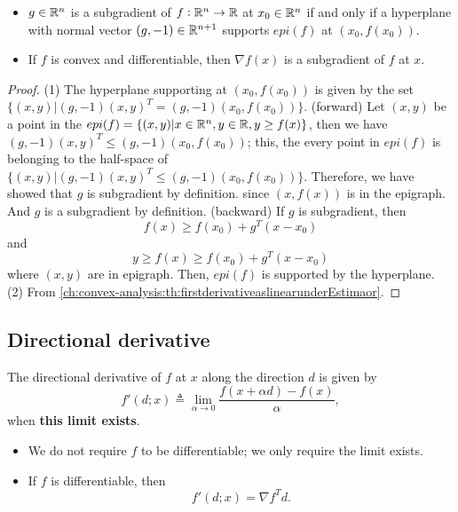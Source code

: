 \begin{refsection}
\begin{lemma}\hfill
\begin{itemize}
	\item $g\in \mathbb{R}^n$ is a subgradient of $f:\mathbb{R}^n\to \mathbb{R}$ at $x_0\in \mathbb{R}^n$ if and only if a hyperplane with normal vector $(g,-1)\in \mathbb{R}^{n+1}$ supports $epi(f)$ at $(x_0,f(x_0))$.
	\item  If $f$ is convex and differentiable, then $\nabla f(x)$ is a subgradient of $f$ at $x$.
\end{itemize}
\end{lemma}
\begin{proof}
(1) The hyperplane supporting at $(x_0,f(x_0))$ is given by the set $\{(x,y)|(g,-1)(x,y)^T = (g,-1)(x_0,f(x_0))\}$. (forward) Let $(x,y)$ be a point in the $epi(f) = \{(x,y)|x\in \mathbb{R}^n,y \in \mathbb{R}, y \geq f(x)\}$, then we have $(g,-1)(x,y)^T \leq (g,-1)(x_0,f(x_0))$; this, the every point in $epi(f)$ is belonging to the half-space of $\{(x,y)|(g,-1)(x,y)^T \leq (g,-1)(x_0,f(x_0))\}$. Therefore, we have showed that 
$g$ is subgradient by definition.
since $(x,f(x))$ is in the epigraph. And $g$ is a subgradient by definition.
(backward) If $g$ is subgradient, then 
$$f(x) \geq f(x_0) + g^T(x-x_0)$$
and 
$$y\geq f(x) \geq f(x_0) + g^T(x-x_0)$$
where $(x,y)$ are in epigraph. Then, $epi(f)$ is supported by the hyperplane.
(2) From \autoref{ch:convex-analysis:th:firstderivativeaslinearunderEstimaor}.
\end{proof}



\subsection{Directional derivative}
\begin{definition}
	The directional derivative of $f$ at $x$ along the direction $d$ is given by
	$$f'(d;x) \triangleq \lim_{\alpha\to 0}\frac{f(x+\alpha d) - f(x)}{\alpha},$$
	when \textbf{this limit exists}.
\end{definition}

\begin{remark}[interpretation]\hfill
	\begin{itemize}
		\item We do not require $f$ to be differentiable; we only require the limit exists.
		\item If $f$ is differentiable, then 
		$$f'(d;x) = \nabla f^T d.$$
	\end{itemize}
	

\end{remark}
\end{refsection}

